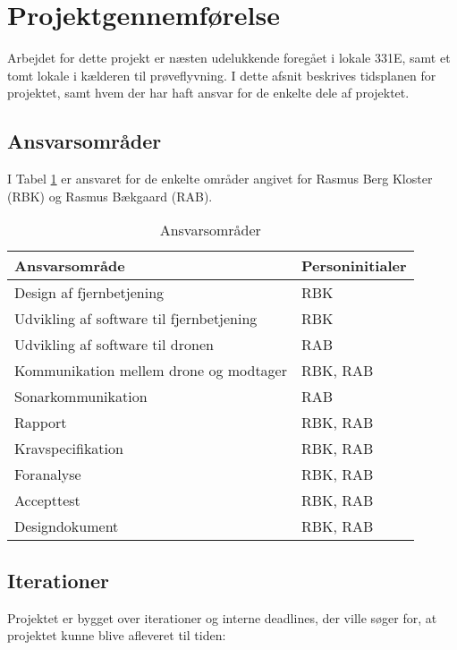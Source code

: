 \documentclass[Main]{subfiles}
\begin{document}
\section{Projektgennemførelse}
Arbejdet for dette projekt er næsten udelukkende foregået i lokale 331E, samt et tomt lokale i kælderen til prøveflyvning.
I dette afsnit beskrives tidsplanen for projektet, samt hvem der har haft ansvar for de enkelte dele af projektet.

\subsection{Ansvarsområder}
I Tabel \ref{Tab:ansvar} er ansvaret for de enkelte områder angivet for Rasmus Berg Kloster (RBK) og Rasmus Bækgaard (RAB).
\begin{table}[H]
\centering
	\begin{tabular}{l l}
	\hline
	\textbf{Ansvarsområde} & \textbf{Personinitialer} \\ \hline
	Design af fjernbetjening & RBK\\
	Udvikling af software til fjernbetjening & RBK\\
	Udvikling af software til dronen & RAB\\
	Kommunikation mellem drone og modtager & RBK, RAB\\
	Sonarkommunikation & RAB\\
	Rapport & RBK, RAB\\
	Kravspecifikation & RBK, RAB\\
	Foranalyse & RBK, RAB\\
	Accepttest & RBK, RAB\\
	Designdokument & RBK, RAB
	\\ \hline
	\end{tabular}
\caption{Ansvarsområder}
\label{Tab:ansvar}
\end{table}


\subsection{Iterationer}
Projektet er bygget over iterationer og interne deadlines, der ville søger for, at projektet kunne blive afleveret til tiden:
\end{document}
